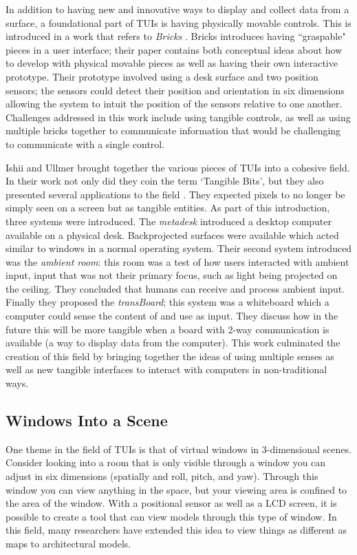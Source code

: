 In addition to having new and innovative ways to display and collect data from a surface, a foundational part of TUIs is having physically movable controls.  This is introduced in a work that refers to \emph{Bricks} \cite{223964}.  Bricks introduces having ``graspable" pieces in a user interface; their paper contains both conceptual ideas about how to develop with physical movable pieces as well as having their own interactive prototype. Their prototype involved using a desk surface and two position sensors; the sensors could detect their position and orientation in six dimensions allowing the system to intuit the position of the sensors relative to one another.  Challenges addressed in this work include using tangible controls, as well as using multiple bricks together to communicate information that would be challenging to communicate with a single control. 


Ishii and Ullmer brought together the various pieces of TUIs into a cohesive field.  In their work not only did they coin the term `Tangible Bits', but they also presented several applications to the field \cite{Ishii97tangiblebits}. They expected pixels to no longer be simply seen on a screen but as tangible entities.  As part of this introduction, three systems were introduced.  The \emph{metadesk} introduced a desktop computer available on a physical desk.  Backprojected surfaces were available which acted similar to windows in a normal operating system.  Their second system introduced was the \emph{ambient room}: this room was a test of how users interacted with ambient input, input that was not their primary focus, such as light being projected on the ceiling.  They concluded that humans can receive and process ambient input.  Finally they proposed the \emph{transBoard}; this system was a whiteboard which a computer could sense the content of and use as input.  They discuss how in the future this will be more tangible when a board with 2-way communication is available (a way to display data from the computer).  This work culminated the creation of this field by bringing together the ideas of using multiple senses as well as new tangible interfaces to interact with computers in non-traditional ways. 


\subsection{Windows Into a Scene}

One theme in the field of TUIs is that of virtual windows in 3-dimensional scenes.  Consider looking into a room that is only visible through a window you can adjust in six dimensions (spatially and roll, pitch, and yaw).   Through this window you can view anything in the space, but your viewing area is confined to the area of the window.  With a positional sensor as well as a LCD screen, it is possible to create a tool that can view models through this type of window.   In this field, many researchers have extended this idea to view things as different as maps to architectural models.

